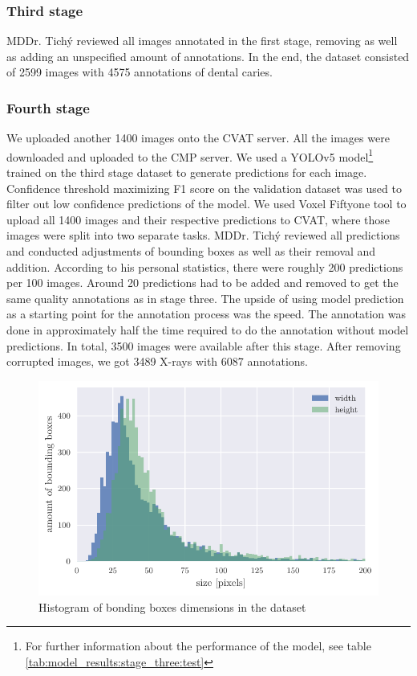 \subsubsection{Third stage}
MDDr. Tichý reviewed all images annotated in the first stage, removing as well as adding an unspecified amount of annotations. In the end, the dataset consisted of 2599 images with 4575 annotations of dental caries.

\subsubsection{Fourth stage}
We uploaded another 1400 images onto the CVAT server. All the images were downloaded and uploaded to the CMP server. We used a  YOLOv5 model\footnote{For further information about the performance of the model, see table \ref{tab:model_results:stage_three:test}} trained on the third stage dataset to generate predictions for each image. Confidence threshold maximizing F1 score on the validation dataset was used to filter out low confidence predictions of the model. We used Voxel Fiftyone tool to upload all 1400 images and their respective predictions to CVAT, where those images were split into two separate tasks.
MDDr. Tichý reviewed all predictions and conducted adjustments of bounding boxes as well as their removal and addition.  According to his personal statistics, there were roughly 200 predictions per 100 images. Around 20 predictions had to be added and removed to get the same quality annotations as in stage three. The upside of using model prediction as a starting point for the annotation process was the speed. The annotation was done in approximately half the time required to do the annotation without model predictions. In total, 3500 images were available after this stage. After removing corrupted images, we got 3489 X-rays with 6087 annotations.

\begin{figure}
    \includegraphics[width = 0.9\linewidth]{images/dataset_histogram.pdf}
    \caption{Histogram of bonding boxes dimensions in the dataset}
    \label{fig:hist_caries_dim}
\end{figure}

